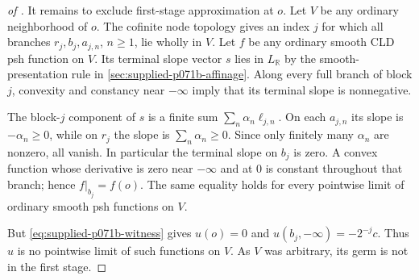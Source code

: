 \begin{proof}[of ]
It remains to exclude first-stage approximation at $o$. Let $V$ be any ordinary neighborhood of $o$. The cofinite node topology gives an index $j$ for which all branches $r_j,b_j,a_{j,n}$, $n\geq1$, lie wholly in $V$. Let $f$ be any ordinary smooth CLD psh function on $V$. Its terminal slope vector $s$ lies in $L_{\mathbb R}$ by the smooth-presentation rule in \cref{sec:supplied-p071b-affinage}. Along every full branch of block $j$, convexity and constancy near $-\infty$ imply that its terminal slope is nonnegative.

The block-$j$ component of $s$ is a finite sum $\sum_n\alpha_n\ell_{j,n}$. On each $a_{j,n}$ its slope is $-\alpha_n\geq0$, while on $r_j$ the slope is $\sum_n\alpha_n\geq0$. Since only finitely many $\alpha_n$ are nonzero, all vanish. In particular the terminal slope on $b_j$ is zero. A convex function whose derivative is zero near $-\infty$ and at $0$ is constant throughout that branch; hence $f|_{b_j}=f(o)$. The same equality holds for every pointwise limit of ordinary smooth psh functions on $V$.

But \eqref{eq:supplied-p071b-witness} gives $u(o)=0$ and $u(b_j,-\infty)=-2^{-j}c$. Thus $u$ is no pointwise limit of such functions on $V$. As $V$ was arbitrary, its germ is not in the first stage.
\end{proof}
